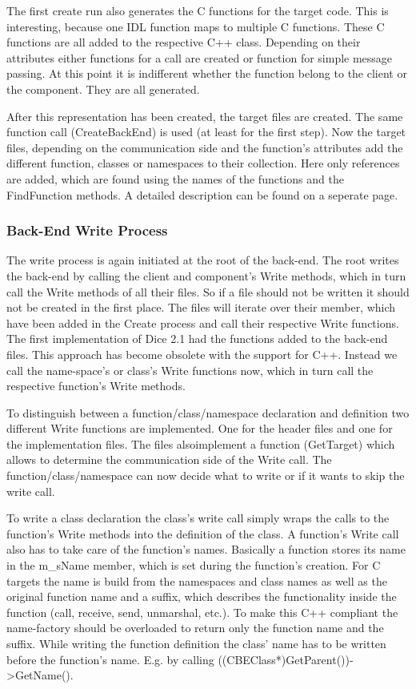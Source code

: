 The first create run also generates the C functions for the target
code. This is interesting, because one IDL function maps to multiple C
functions. These C functions are all added to the respective C++
class. Depending on their attributes either functions for a call are
created or function for simple message passing. At this point it is
indifferent whether the function belong to the client or the
component. They are all generated.

After this representation has been created, the target files are
created. The same function call (CreateBackEnd) is used (at least for
the first step). Now the target files, depending on the communication
side and the function's attributes add the different function, classes
or namespaces to their collection. Here only references are added,
which are found using the names of the functions and the FindFunction
methods. A detailed description can be found on a seperate page.

\subsubsection{Back-End Write Process}
The write process is again initiated at the root of the back-end. The
root writes the back-end by calling the client and component's Write
methods, which in turn call the Write methods of all their files. So
if a file should not be written it should not be created in the first
place. The files will iterate over their member, which have been added
in the Create process and call their respective Write functions. The
first implementation of Dice 2.1 had the functions added to the
back-end files. This approach has become obsolete with the support for
C++. Instead we call the name-space's or class's Write functions now,
which in turn call the respective function's Write methods.

To distinguish between a function/class/namespace declaration and
definition two different Write functions are implemented. One for the
header files and one for the implementation files. The files
alsoimplement a function (GetTarget) which allows to determine the
communication side of the Write call. The function/class/namespace can
now decide what to write or if it wants to skip the write call.

To write a class declaration the class's write call simply wraps the
calls to the function's Write methods into the definition of the
class. A function's Write call also has to take care of the function's
names. Basically a function stores its name in the m_sName member,
which is set during the function's creation. For C targets the name is
build from the namespaces and class names as well as the original
function name and a suffix, which describes the functionality inside
the function (call, receive, send, unmarshal, etc.). To make this C++
compliant the name-factory should be overloaded to return only the
function name and the suffix. While writing the function definition
the class' name has to be written before the function's name. E.g. by
calling ((CBEClass*)GetParent())->GetName().

